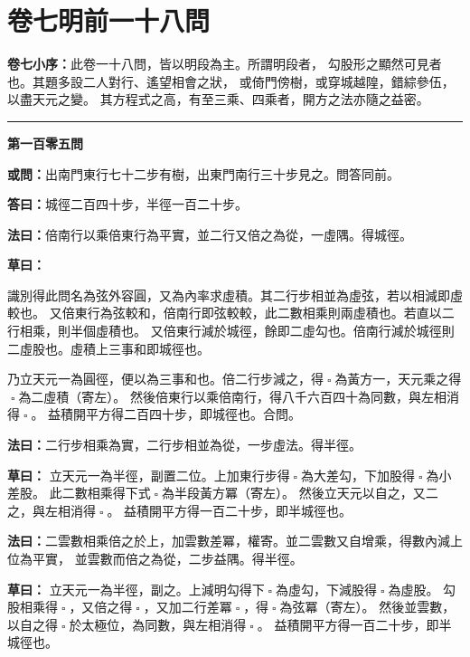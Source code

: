 \documentclass[11pt,a4paper]{article}
\let\origsquare\square
\renewcommand{\square}{\ensuremath{\origsquare}}%
\newcommand{\longline}{\noindent\rule{\textwidth}{0.4pt}}
\newcommand{\owen}[1]{%
  \par\vspace{0.4em}%
  \noindent\textcolor{problemcolor}{\textbf{或問：}}{\tradfont #1}\par\nopagebreak%
}
\newcommand{\fayue}[1]{%
  \par\noindent\textcolor{methodcolor}{\textbf{法曰：}}{\tradfont #1}\par\nopagebreak%
}
\newcommand{\tsaoyue}[1]{%
  \par\noindent\textcolor{workcolor}{\textbf{草曰：}}{\tradfont #1}\par%
}
\newcommand{\dayue}[1]{%
  \par\noindent\textcolor{anscolor}{\textbf{答曰：}}{\tradfont #1}\par\nopagebreak%
}
\newcommand{\wen}[1]{\par\vspace{0.3em}\noindent\textcolor{problemcolor}{\textbf{第#1問}}\par}
\begin{document}
\newpage


\section{\tradfont 卷七\quad 明前一十八問}
\label{sec:vol7}

\begin{tradfont}
\noindent\textbf{卷七小序：}此卷一十八問，皆以明段為主。所謂明段者，
勾股形之顯然可見者也。其題多設二人對行、遙望相會之狀，
或倚門傍樹，或穿城越隍，錯綜參伍，以盡天元之變。
其方程式之高，有至三乘、四乘者，開方之法亦隨之益密。
\end{tradfont}

\vspace{0.3cm}
\begin{center}
\longline
\end{center}

\wen{一百零五}
\owen{出南門東行七十二步有樹，出東門南行三十步見之。問答同前。}
\dayue{城徑二百四十步，半徑一百二十步。}

\fayue{倍南行以乘倍東行為平實，並二行又倍之為從，一虛隅。得城徑。}

\tsaoyue{%
識別得此問名為弦外容圓，又為內率求虛積。其二行步相並為虛弦，若以相減即虛較也。
又倍東行為弦較和，倍南行即弦較較，此二數相乘則兩虛積也。若直以二行相乘，則半個虛積也。
又倍東行減於城徑，餘即二虛勾也。倍南行減於城徑則二虛股也。虛積上三事和即城徑也。

乃立天元一為圓徑，便以為三事和也。倍二行步減之，得$ \; \square \; $為黃方一，天元乘之得$ \; \square \; $為二虛積（寄左）。
然後倍東行以乘倍南行，得八千六百四十為同數，與左相消得$ \; \square \; $。
益積開平方得二百四十步，即城徑也。合問。}

\fayue{二行步相乘為實，二行步相並為從，一步虛法。得半徑。}

\tsaoyue{%
立天元一為半徑，副置二位。上加東行步得$ \; \square \; $為大差勾，下加股得$ \; \square \; $為小差股。
此二數相乘得下式$ \; \square \; $為半段黃方冪（寄左）。
然後立天元以自之，又二之，與左相消得$ \; \square \; $。
益積開平方得一百二十步，即半城徑也。}

\fayue{二雲數相乘倍之於上，加雲數差冪，權寄。並二雲數又自增乘，得數內減上位為平實，
並雲數而倍之為從，二步益隅。得半徑。}

\tsaoyue{%
立天元一為半徑，副之。上減明勾得下$ \; \square \; $為虛勾，下減股得$ \; \square \; $為虛股。
勾股相乘得$ \; \square \; $，又倍之得$ \; \square \; $，又加二行差冪$ \; \square \; $，得$ \; \square \; $為弦冪（寄左）。
然後並雲數，以自之得$ \; \square \; $於太極位，為同數，與左相消得$ \; \square \; $。
益積開平方得一百二十步，即半城徑也。}
\end{document}
